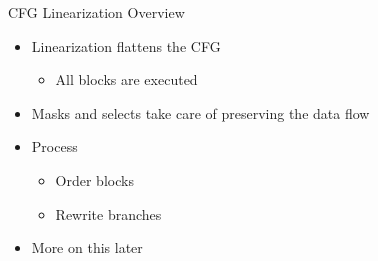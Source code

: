 \begin{frame}{CFG Linearization Overview}

\begin{minipage}[t]{0.45\linewidth}

\begin{itemize}
    \item Linearization flattens the CFG
    \begin{itemize}
        \item All blocks are executed
    \end{itemize}
    \item Masks and selects take care of preserving the data flow
    \item Process
    \begin{itemize}
        \item Order blocks
        \item Rewrite branches
    \end{itemize}
    \item More on this later
\end{itemize}

\end{minipage}
\hspace{1em}
\begin{minipage}[t]{0.43\linewidth}

\vspace{0.1ex}


\end{minipage}

\end{frame}

